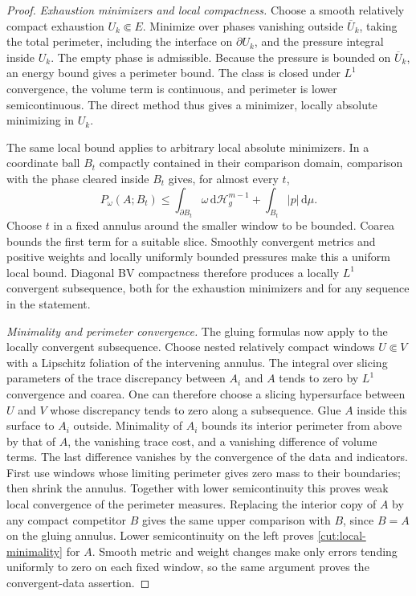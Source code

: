 \documentclass[11pt]{article}
\numberwithin{equation}{section}
\theoremstyle{definition}
\theoremstyle{remark}
\begin{document}
\begin{proof}
\emph{Exhaustion minimizers and local compactness.}
Choose a smooth relatively compact exhaustion $U_k\Subset E$.
Minimize over phases vanishing outside $\overline U_k$, taking the total
perimeter, including the interface on $\partial U_k$, and the pressure
integral inside $U_k$.  The empty phase is admissible.  Because the
pressure is bounded on $\overline U_k$, an energy bound gives a perimeter
bound.  The class is closed under $L^1$ convergence, the volume term is
continuous, and perimeter is lower semicontinuous.  The direct method
thus gives a minimizer, locally absolute minimizing in $U_k$.

The same local bound applies to arbitrary local absolute minimizers.
In a coordinate ball $B_t$ compactly contained in their comparison
domain, comparison with the phase cleared inside $B_t$ gives, for almost
every $t$,
\[
 P_\omega(A;B_t)\le\int_{\partial B_t}\omega\,\mathrm d\mathcal H_g^{m-1}
                         +\int_{B_t}|p|\,\mathrm d\mu.
\]
Choose $t$ in a fixed annulus around the smaller window to be bounded.
Coarea bounds the first term for a suitable slice.  Smoothly convergent
metrics and positive weights and locally uniformly bounded pressures
make this a uniform local bound.  Diagonal BV compactness therefore
produces a locally $L^1$ convergent subsequence, both for the exhaustion
minimizers and for any sequence in the statement.

\emph{Minimality and perimeter convergence.}
The gluing formulas now apply to the locally convergent subsequence.
Choose nested relatively compact windows $U\Subset V$
with a Lipschitz foliation of the intervening annulus.  The integral over
slicing parameters of the trace discrepancy between $A_i$ and $A$ tends
to zero by $L^1$ convergence and coarea.  One can therefore choose a
slicing hypersurface between $U$ and $V$ whose discrepancy tends to zero
along a subsequence.  Glue $A$ inside this surface to $A_i$ outside.
Minimality of $A_i$ bounds its interior perimeter from above by that of
$A$, the vanishing trace cost, and a vanishing difference of volume
terms.  The last difference vanishes by the convergence of the data and
indicators.  First use windows whose limiting perimeter gives zero mass
to their boundaries; then shrink the annulus.  Together with lower
semicontinuity this proves weak local convergence of the perimeter
measures.  Replacing the interior copy of $A$ by any compact competitor
$B$ gives the same upper comparison with $B$, since $B=A$ on the gluing
annulus.  Lower semicontinuity on the left proves
\eqref{cut:local-minimality} for $A$.  Smooth metric and weight changes
make only errors tending uniformly to zero on each fixed window, so the
same argument proves the convergent-data assertion.


\end{proof}
\end{document}
